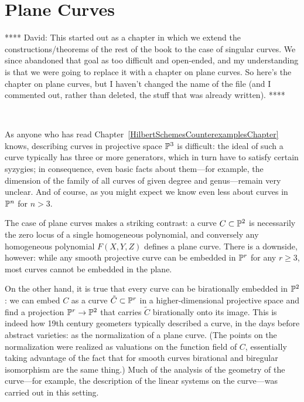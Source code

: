 

\chapter{Plane Curves}
\label{PlaneCurvesChapter}

**** David: This started out as a chapter in which we extend the constructions/theorems of the rest of the book to the case of singular curves. We since abandoned that goal as too difficult and open-ended, and my understanding is that we were going to replace it with a chapter on plane curves. So here's the chapter on plane curves, but I haven't changed the name of the file (and I commented out, rather than deleted, the stuff that was already written). ****

\

As anyone who has read  Chapter~\ref{HilbertSchemesCounterexamplesChapter} knows, describing curves in projective space ${\mathbb P}^3$  is difficult: the ideal of such a curve typically has three or more generators, which in turn have to satisfy certain syzygies; in consequence, even basic facts about them---for example, the dimension of the family of all curves of given degree and genus---remain very unclear. And of course, as you might expect we know even less about curves in ${\mathbb P}^n$ for $n > 3$.

The case of plane curves makes a striking contrast: a curve $C \subset {\mathbb P}^2$ is necessarily the zero locus of a single homogeneous polynomial, and conversely any homogeneous polynomial $F(X,Y,Z)$ defines a plane curve. There is a downside, however: while any smooth projective curve can be embedded in ${\mathbb P}^r$ for any $r \geq 3$, most curves cannot be embedded in the plane. 

On the other hand, it is true that every curve can be birationally embedded in ${\mathbb P}^2$: we can embed $C$ as a curve $\tilde C \subset {\mathbb P}^r$ in a higher-dimensional projective space and find a projection ${\mathbb P}^r \to {\mathbb P}^2$ that carries $\tilde C$ birationally onto its image. This is indeed how 19th century geometers typically described a curve, in the days before abstract varieties: as the normalization of a plane curve. (The points on the normalization were realized as valuations on the function field of $C$, essentially taking advantage of the fact that for smooth curves birational and biregular isomorphism are the same thing.) Much of the analysis of the geometry of the curve---for example, the description of the linear systems on the curve---was carried out in this setting.

